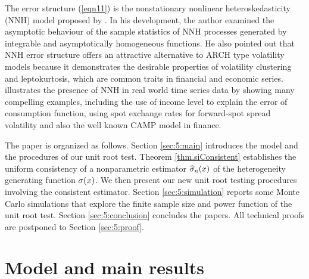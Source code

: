 The error structure (\ref {eqn11}) is the nonstationary nonlinear heteroskedasticity (NNH) model proposed by \cite{park2002}. In his development, the author examined the asymptotic behaviour of the sample statistics of NNH processes generated by integrable and asymptotically homogeneous functions. He also pointed out that NNH error structure offers an attractive alternative to ARCH type volatility models because it demonstrates the desirable properties of volatility clustering and leptokurtosis, which are common traits in financial and economic series. \cite{chungpark2007} illustrates the presence of NNH in real world time series data by showing many compelling examples, including the use of income level to explain
the error of consumption function, using spot exchange rates for
forward-spot spread volatility and also the well known CAMP model in
finance.

The paper is organized as follows. Section \ref{sec:5:main} introduces the model and the procedures of our unit root test. Theorem \ref{thm.siConsistent} establishes the uniform consistency of a nonparametric estimator $\widehat{\sigma}_n(x)$ of the heterogeneity generating function $\sigma(x)$. We then present our new unit root testing procedures involving the consistent estimator. Section \ref{sec:5:simulation} reports some Monte Carlo simulations that explore the finite sample size and power function of the unit root test. Section \ref{sec:5:conclusion} concludes the papers. All technical proofs are postponed to Section \ref{sec:5:proof}.

\section{Model and main results} 

